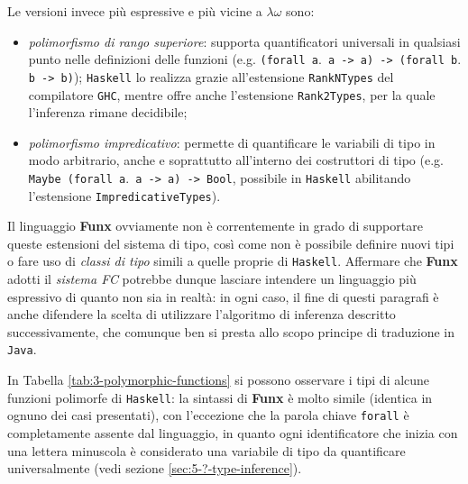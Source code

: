 \noindent Le versioni invece più espressive e più vicine a $\lambda\omega$ sono:
\begin{itemize}
    \item \textit{polimorfismo di rango superiore}: supporta quantificatori universali in qualsiasi punto
          nelle definizioni delle funzioni (e.g. \texttt{(forall a$\mathord{.}$ a -> a) -> (forall b$\mathord{.}$ b -> b)});
          \texttt{Haskell} lo realizza grazie all'estensione \texttt{RankNTypes} del compilatore \texttt{GHC},
          mentre offre anche l'estensione \texttt{Rank2Types}, per la quale l'inferenza rimane decidibile;
    \item \textit{polimorfismo impredicativo}: permette di quantificare le variabili di tipo in modo arbitrario,
          anche e soprattutto all'interno dei costruttori di tipo (e.g. \texttt{Maybe (forall a$\mathord{.}$ a -> a) -> Bool},
          possibile in \texttt{Haskell} abilitando l'estensione \texttt{ImpredicativeTypes}).
\end{itemize}

\noindent Il linguaggio \textbf{Funx} ovviamente non è correntemente in grado di supportare queste estensioni
del sistema di tipo, così come non è possibile definire nuovi tipi o fare uso di \textit{classi di tipo}
simili a quelle proprie di \texttt{Haskell}. Affermare che \textbf{Funx} adotti il \textit{sistema FC} potrebbe dunque
lasciare intendere un linguaggio più espressivo di quanto non sia in realtà: in ogni caso,
il fine di questi paragrafi è anche difendere la scelta di utilizzare l'algoritmo di inferenza descritto successivamente,
che comunque ben si presta allo scopo principe di traduzione in \texttt{Java}.


In Tabella \ref{tab:3-polymorphic-functions} si possono osservare i tipi di alcune funzioni polimorfe
di \texttt{Haskell}: la sintassi di \textbf{Funx} è molto simile (identica in ognuno dei casi presentati),
con l'eccezione che la parola chiave \texttt{forall} è completamente assente dal linguaggio, in quanto ogni identificatore
che inizia con una lettera minuscola è considerato una variabile di tipo da quantificare universalmente
(vedi sezione \ref{sec:5-?-type-inference}).

\newpage

